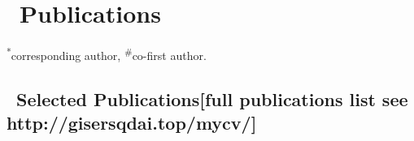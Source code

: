 \newcommand{\Revision}{\textit{under revision}}
\newcommand{\Review}{\textit{under review}}
\newcommand{\Submitted}{\textit{submitted}}
\newcommand{\CS}{\textsuperscript{*}} %
\newcommand{\CF}{\textsuperscript{\#}} %

\section{\texorpdfstring{\faBook\ Publications}{Publications}}
\CS corresponding author, \CF co-first author.

\subsection*{\texorpdfstring{\faBook\ Selected Publications[full publications list see http://gisersqdai.top/mycv/]}{Selected Publications[full publications list see http://gisersqdai.top/mycv/}}
